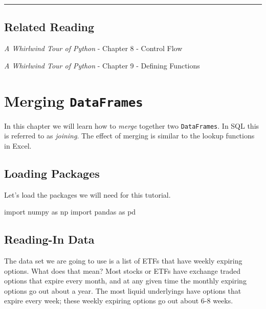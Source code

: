 \documentclass[
  letterpaper,
  DIV=11,
  numbers=noendperiod]{scrreprt}
\newenvironment{Shaded}{\begin{snugshade}}{\end{snugshade}}
\newcommand{\ImportTok}[1]{\textcolor[rgb]{0.00,0.46,0.62}{#1}}
\newcommand{\NormalTok}[1]{\textcolor[rgb]{0.00,0.23,0.31}{#1}}
\begin{document}
\begin{center}\rule{0.5\linewidth}{0.5pt}\end{center}

\hypertarget{related-reading-3}{%
\section{Related Reading}\label{related-reading-3}}

\emph{A Whirlwind Tour of Python} - Chapter 8 - Control Flow

\emph{A Whirlwind Tour of Python} - Chapter 9 - Defining Functions

\hypertarget{merging-dataframes}{%
\chapter{\texorpdfstring{Merging
\texttt{DataFrames}}{Merging DataFrames}}\label{merging-dataframes}}

In this chapter we will learn how to \emph{merge} together two
\texttt{DataFrames}. In SQL this is referred to as \emph{joining}. The
effect of merging is similar to the lookup functions in Excel.

\hypertarget{loading-packages-1}{%
\section{Loading Packages}\label{loading-packages-1}}

Let's load the packages we will need for this tutorial.

\begin{Shaded}
\begin{Highlighting}[]
\ImportTok{import}\NormalTok{ numpy }\ImportTok{as}\NormalTok{ np}
\ImportTok{import}\NormalTok{ pandas }\ImportTok{as}\NormalTok{ pd}
\end{Highlighting}
\end{Shaded}

\hypertarget{reading-in-data-4}{%
\section{Reading-In Data}\label{reading-in-data-4}}

The data set we are going to use is a list of ETFs that have weekly
expiring options. What does that mean? Most stocks or ETFs have exchange
traded options that expire every month, and at any given time the
monthly expiring options go out about a year. The most liquid
underlyings have options that expire every week; these weekly expiring
options go out about 6-8 weeks.
\end{document}
